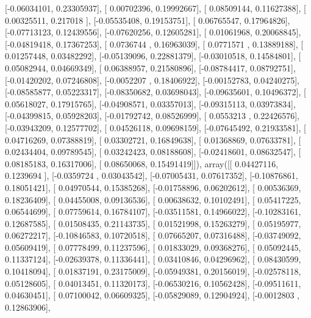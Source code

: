 \documentclass{article}
\begin{document}
       [-0.06034101,  0.23305937],
       [ 0.00702396,  0.19992667],
       [ 0.08509144,  0.11627388],
       [ 0.00325511,  0.217018  ],
       [-0.05535408,  0.19153751],
       [ 0.06765547,  0.17964826],
       [-0.07713123,  0.12439556],
       [-0.07620256,  0.12605281],
       [ 0.01061968,  0.20068845],
       [-0.04819418,  0.17367253],
       [ 0.0736744 ,  0.16963039],
       [ 0.0771571 ,  0.13889188],
       [ 0.01257448,  0.03482292],
       [-0.05139096,  0.22881379],
       [-0.03010518,  0.14584801],
       [ 0.05082944,  0.04669349],
       [ 0.06388957,  0.21580896],
       [-0.08784417,  0.08792751],
       [-0.01420202,  0.07246808],
       [-0.0052207 ,  0.18406922],
       [-0.00152783,  0.04240275],
       [-0.08585877,  0.05223317],
       [-0.08350682,  0.03698043],
       [-0.09635601,  0.10496372],
       [ 0.05618027,  0.17915765],
       [-0.04908571,  0.03357013],
       [-0.09315113,  0.03973834],
       [-0.04399815,  0.05928203],
       [-0.01792742,  0.08526999],
       [ 0.0553213 ,  0.22426576],
       [-0.03943209,  0.12577702],
       [ 0.04526118,  0.09698159],
       [-0.07645492,  0.21933581],
       [ 0.04716269,  0.07388819],
       [ 0.03302721,  0.16849638],
       [ 0.01368869,  0.07633781],
       [ 0.02434404,  0.09789545],
       [ 0.03242423,  0.08188608],
       [-0.02418601,  0.08632547],
       [ 0.08185183,  0.16317006],
       [ 0.08650068,  0.15491419]]), array([[ 0.04427116,  0.1239694 ],
       [-0.0359724 ,  0.03043542],
       [-0.07005431,  0.07617352],
       [-0.10876861,  0.18051421],
       [ 0.04970544,  0.15385268],
       [-0.01758896,  0.06202612],
       [ 0.00536369,  0.18236409],
       [ 0.04455008,  0.09136536],
       [ 0.00638632,  0.10102491],
       [ 0.05417225,  0.06544699],
       [ 0.07759614,  0.16784107],
       [-0.03511581,  0.14966022],
       [-0.10283161,  0.12687585],
       [ 0.01508435,  0.21143735],
       [ 0.01521998,  0.15263279],
       [ 0.05195977,  0.06272217],
       [-0.10846583,  0.10720518],
       [ 0.07665207,  0.07316488],
       [-0.03749092,  0.05609419],
       [ 0.07778499,  0.11237596],
       [ 0.01833029,  0.09368276],
       [ 0.05092445,  0.11337124],
       [-0.02639378,  0.11336441],
       [ 0.03410846,  0.04296962],
       [ 0.08430599,  0.10418094],
       [ 0.01837191,  0.23175009],
       [-0.05949381,  0.20156019],
       [-0.02578118,  0.05128605],
       [ 0.04013451,  0.11320173],
       [-0.06530216,  0.10562428],
       [-0.09511611,  0.04630451],
       [ 0.07100042,  0.06609325],
       [-0.05829089,  0.12904924],
       [-0.0012803 ,  0.12863906],
\end{document}
